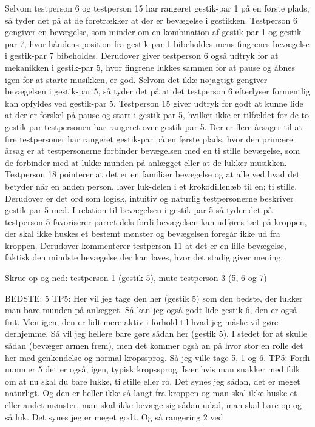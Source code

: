 Selvom testperson 6 og testperson 15 har rangeret gestik-par 1 på en første plads, så tyder det på at de foretrækker at der er bevægelse i gestikken. Testperson 6 gengiver en bevægelse, som minder om en kombination af gestik-par 1 og gestik-par 7, hvor håndens position fra gestik-par 1 bibeholdes mens fingrenes bevægelse i gestik-par 7 bibeholdes. Derudover giver testperson 6 også udtryk for at mekanikken i gestik-par 5, hvor fingrene lukkes sammen for at pause og åbnes igen for at starte musikken, er god. Selvom det ikke nøjagtigt gengiver bevægelsen i gestik-par 5, så tyder det på at det testperson 6 efterlyser formentlig kan opfyldes ved gestik-par 5. Testperson 15 giver udtryk for godt at kunne lide at der er forskel på pause og start i gestik-par 5, hvilket ikke er tilfældet for de to gestik-par testpersonen har rangeret over gestik-par 5. \blankline
%
Der er flere årsager til at fire testpersoner har rangeret gestik-par på en første plads, hvor den primære årsag er at testpersonerne forbinder bevægelsen med en ti stille bevægelse, som de forbinder med at lukke munden på anlægget eller at de lukker musikken. Testperson 18 pointerer at det er en familiær bevægelse og at alle ved hvad det betyder når en anden person, laver luk-delen i et krokodillenæb til en; ti stille. Derudover er det ord som logisk, intuitiv og naturlig testpersonerne beskriver gestik-par 5 med. I relation til bevægelsen i gestik-par 5 så tyder det på testperson 5 favoriserer parret dels fordi bevægelsen kan udføres tæt på kroppen, der skal ikke huskes et bestemt mønster og bevægelsen foregår ikke ud fra kroppen. Derudover kommenterer testperson 11 at det er en lille bevægelse, faktisk den mindste bevægelse der kan laves, hvor det stadig giver mening.   





Skrue op og ned: testperson 1 (gestik 5), mute testperson 3 (5, 6 og 7)









BEDSTE: 5
TP5: Her vil jeg tage den her (gestik 5) som den bedste, der lukker man bare munden på anlægget.  Så kan jeg også godt lide gestik 6, den er også fint. Men igen, den er lidt mere aktiv i forhold til hvad jeg måske vil gøre derhjemme. Så vil jeg hellere bare gøre sådan her (gestik 5). I stedet for at skulle sådan (bevæger armen frem), men det kommer også an på hvor stor en rolle det her med genkendelse og normal kropssprog. Så jeg ville tage 5, 1 og 6. 
TP5: Fordi nummer 5 det er også, igen, typisk kropssprog. Især hvis man snakker med folk om at nu skal du bare lukke, ti stille eller ro. Det synes jeg sådan, det er meget naturligt. Og den er heller ikke så langt fra kroppen og man skal ikke huske et eller andet mønster, man skal ikke bevæge sig sådan udad, man skal bare op og så luk. Det synes jeg er meget godt. Og så rangering 2 ved  


